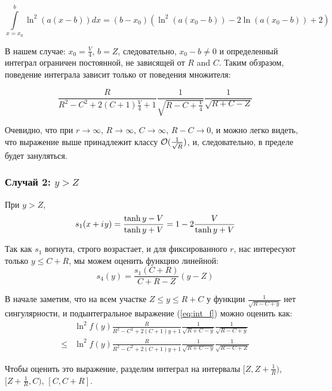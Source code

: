 \[
\int\limits_{x=x_0}^b \ln^2(a (x - b)) dx = (b - x_0) (\ln^2(a (x_0 - b)) - 2 \ln(a (x_0 - b)) + 2)
\]

В нашем случае: $x_0 = \frac{V}{4}$, $b = Z$, следовательно, $x_0 - b \ne 0$ и определенный интеграл ограничен постоянной, не зависящей от $R$ and $C$. Таким обзразом, поведение интеграла зависит только от поведения множителя:

\[
\frac{R}{R^2 - C^2 + 2 (C + 1) \frac{V}{4} + 1} \frac{1}{\sqrt{R - C + \frac{V}{4}}} \frac{1}{\sqrt{R + C - Z}}
\]

Очевидно, что при $r \to \infty$, $R \to \infty$, $C \to \infty$, $R - C \to 0$, и можно легко видеть, что выражение выше принадлежит классу $\mathcal{O}(\frac{1}{\sqrt{R}})$, и, следовательно, в пределе будет зануляться.

\subsubsection{Случай 2: $y > Z$}
При $y > Z$, 
\[
s_1(x + {i\mkern1mu} y) 
 = \frac{\tanh y - V}{\tanh y + V}
 = 1 - 2 \frac{V}{\tanh y + V}
\]

Так как $s_1$ вогнута, строго возрастает, и для фиксированного $r$, нас интересуют только $y \le C + R$, мы можем оценить функцию линейной: 
\[
s_4(y) = 
\frac{s_1(C + R)}{C + R - Z} (y - Z) %
\]


В начале заметим, что на всем участке $Z \le y \le R + C$ у функции $\frac{1}{\sqrt{R - C + y}}$ нет сингулярности, и подынтегральное выражение (\ref{eq:int_f}) можно оценить как:
\begin{equation}\label{eq:int_f_up}
\begin{aligned}
       & \ln^2 f(y) \frac{R}{R^2 - C^2 + 2 (C + 1) y + 1} \frac{1}{\sqrt{R + C - y}} \frac{1}{\sqrt{R - C + y}}
\\ \le & \ln^2 f(y) \frac{R}{R^2 - C^2 + 2 (C + 1) y + 1} \frac{1}{\sqrt{R + C - y}} \frac{1}{\sqrt{R - C + Z}}
\end{aligned}
\end{equation}

Чтобы оценить это выражение, разделим интеграл на интервалы $[Z, Z + \frac{1}{R})$, $[Z + \frac{1}{R}, C)$, $[C, C + R]$.

